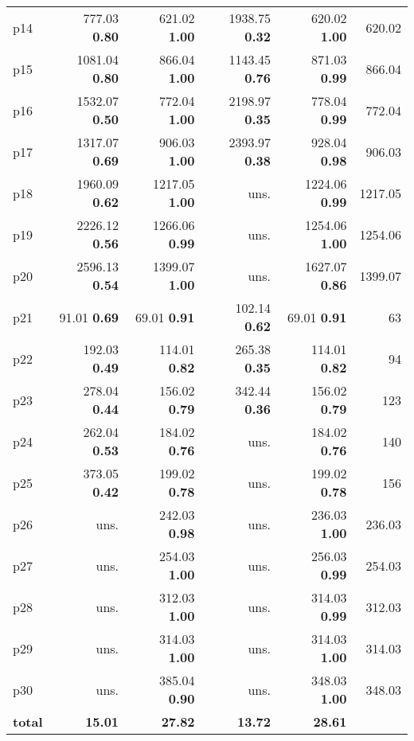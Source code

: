 \begin{tabular}{|l|rrrr|r|}
p14 & {\footnotesize 777.03} \textbf{0.80} & {\footnotesize 621.02} \textbf{1.00} & {\footnotesize 1938.75} \textbf{0.32} & {\footnotesize 620.02} \textbf{1.00} & 620.02\\
p15 & {\footnotesize 1081.04} \textbf{0.80} & {\footnotesize 866.04} \textbf{1.00} & {\footnotesize 1143.45} \textbf{0.76} & {\footnotesize 871.03} \textbf{0.99} & 866.04\\
p16 & {\footnotesize 1532.07} \textbf{0.50} & {\footnotesize 772.04} \textbf{1.00} & {\footnotesize 2198.97} \textbf{0.35} & {\footnotesize 778.04} \textbf{0.99} & 772.04\\
p17 & {\footnotesize 1317.07} \textbf{0.69} & {\footnotesize 906.03} \textbf{1.00} & {\footnotesize 2393.97} \textbf{0.38} & {\footnotesize 928.04} \textbf{0.98} & 906.03\\
p18 & {\footnotesize 1960.09} \textbf{0.62} & {\footnotesize 1217.05} \textbf{1.00} & uns. & {\footnotesize 1224.06} \textbf{0.99} & 1217.05\\
p19 & {\footnotesize 2226.12} \textbf{0.56} & {\footnotesize 1266.06} \textbf{0.99} & uns. & {\footnotesize 1254.06} \textbf{1.00} & 1254.06\\
p20 & {\footnotesize 2596.13} \textbf{0.54} & {\footnotesize 1399.07} \textbf{1.00} & uns. & {\footnotesize 1627.07} \textbf{0.86} & 1399.07\\
p21 & {\footnotesize 91.01} \textbf{0.69} & {\footnotesize 69.01} \textbf{0.91} & {\footnotesize 102.14} \textbf{0.62} & {\footnotesize 69.01} \textbf{0.91} & 63\\
p22 & {\footnotesize 192.03} \textbf{0.49} & {\footnotesize 114.01} \textbf{0.82} & {\footnotesize 265.38} \textbf{0.35} & {\footnotesize 114.01} \textbf{0.82} & 94\\
p23 & {\footnotesize 278.04} \textbf{0.44} & {\footnotesize 156.02} \textbf{0.79} & {\footnotesize 342.44} \textbf{0.36} & {\footnotesize 156.02} \textbf{0.79} & 123\\
p24 & {\footnotesize 262.04} \textbf{0.53} & {\footnotesize 184.02} \textbf{0.76} & uns. & {\footnotesize 184.02} \textbf{0.76} & 140\\
p25 & {\footnotesize 373.05} \textbf{0.42} & {\footnotesize 199.02} \textbf{0.78} & uns. & {\footnotesize 199.02} \textbf{0.78} & 156\\
p26 & uns. & {\footnotesize 242.03} \textbf{0.98} & uns. & {\footnotesize 236.03} \textbf{1.00} & 236.03\\
p27 & uns. & {\footnotesize 254.03} \textbf{1.00} & uns. & {\footnotesize 256.03} \textbf{0.99} & 254.03\\
p28 & uns. & {\footnotesize 312.03} \textbf{1.00} & uns. & {\footnotesize 314.03} \textbf{0.99} & 312.03\\
p29 & uns. & {\footnotesize 314.03} \textbf{1.00} & uns. & {\footnotesize 314.03} \textbf{1.00} & 314.03\\
p30 & uns. & {\footnotesize 385.04} \textbf{0.90} & uns. & {\footnotesize 348.03} \textbf{1.00} & 348.03\\
\hline
\textbf{total} & \textbf{15.01} & \textbf{27.82} & \textbf{13.72} & \textbf{28.61} & \\
\hline
\end{tabular}

